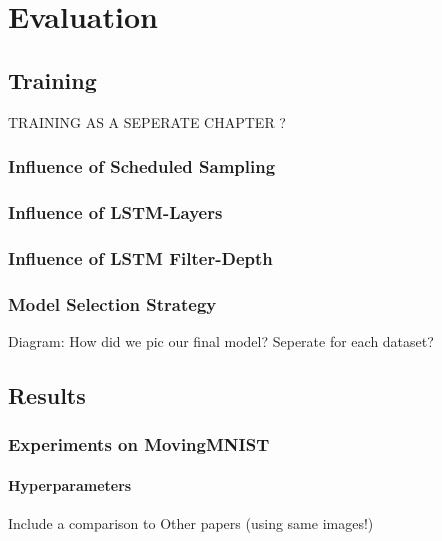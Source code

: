 
\chapter{Evaluation} \label{chapter:evaluation}


\section{Training}

TRAINING AS A SEPERATE CHAPTER ?

\subsection{Influence of Scheduled Sampling}

\subsection{Influence of LSTM-Layers}

\subsection{Influence of LSTM Filter-Depth}

\subsection{Model Selection Strategy}

Diagram: How did we pic our final model?
Seperate for each dataset?


\section{Results}

\subsection{Experiments on MovingMNIST}

\subsubsection{Hyperparameters}

Include a comparison to Other papers (using same images!)

